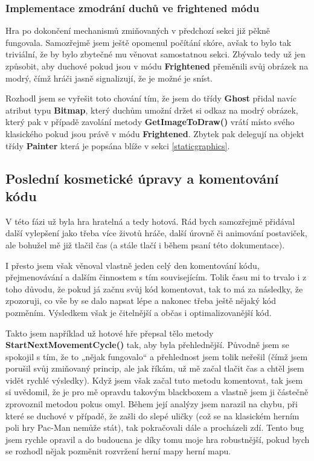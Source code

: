 \documentclass[a4]{article}
\begin{document}
\subsubsection{Implementace zmodrání duchů ve frightened módu} \label{frightenedmode}
Hra po dokončení mechanismů zmiňovaných v předchozí sekci již pěkně fungovala. Samozřejmě jsem ještě opomenul počítání skóre, avšak to bylo tak triviální, že by bylo zbytečné mu věnovat samostatnou sekci. Zbývalo tedy už jen způsobit, aby duchové pokud jsou v módu \textbf{Frightened} přeměnili svůj obrázek na modrý, čímž hráči jasně signalizují, že je možné je sníst. 

Rozhodl jsem se vyřešit toto chování tím, že jsem do třídy \textbf{Ghost} přidal navíc atribut typu \textbf{Bitmap}, který duchům umožní držet si odkaz na modrý obrázek, který pak v případě zavolání metody \textbf{GetImageToDraw()} vrátí místo svého klasického pokud jsou právě v módu \textbf{Frightened}. Zbytek pak delegují na objekt třídy \textbf{Painter} která je popsána blíže v sekci \ref{staticgraphics}.

\subsection{Poslední kosmetické úpravy a komentování kódu}
V této fázi už byla hra hratelná a tedy hotová. Rád bych samozřejmě přidával další vylepšení jako třeba více životů hráče, další úrovně či animování postaviček, ale bohužel mě již tlačil čas (a stále tlačí i během psaní této dokumentace). 

I přesto jsem však věnoval vlastně jeden celý den komentování kódu, přejmenovávání a dalším činnostem s tím souvisejícím. Tolik času mi to trvalo i z toho důvodu, že pokud já začnu svůj kód komentovat, tak to má za následky, že zpozoruji, co vše by se dalo napsat lépe a nakonec třeba ještě nějaký kód pozměním. Výsledkem však je čitelnější a občas i optimalizovanější kód. 

Takto jsem například už hotové hře přepsal tělo metody \textbf{StartNextMovementCycle()} tak, aby byla přehlednější. Původně jsem se spokojil s tím, že to „nějak fungovalo“ a přehlednost jsem tolik neřešil (čímž jsem porušil svůj zmiňovaný princip, ale jak říkám, už mě začal tlačit čas a chtěl jsem vidět rychlé výsledky). Když jsem však začal tuto metodu komentovat, tak jsem si uvědomil, že je pro mě opravdu takovým blackboxem a vlastně jsem ji částečně zprovoznil metodou pokus omyl. Během její analýzy jsem narazil na chybu, při které se duchové v případě, že zašli do slepé uličky (což se na klasickém herním poli hry Pac-Man nemůže stát), tak pokračovali dále a procházeli zdí. Tento bug jsem rychle opravil a do budoucna je díky tomu moje hra robustnější, pokud bych se rozhodl nějak pozměnit rozvržení herní mapy herní mapu.
\end{document}
